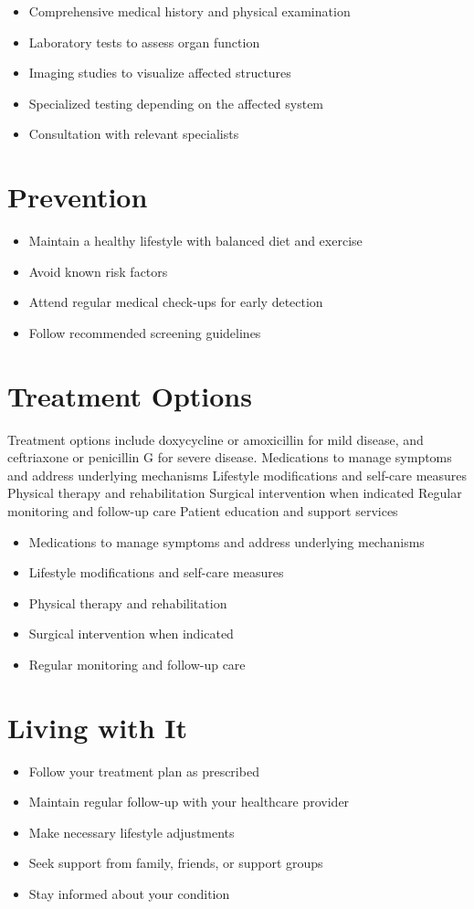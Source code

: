 \begin{itemize}[noitemsep]
  \item Comprehensive medical history and physical examination
  \item Laboratory tests to assess organ function
  \item Imaging studies to visualize affected structures
  \item Specialized testing depending on the affected system
  \item Consultation with relevant specialists
\end{itemize}
\section{Prevention}
\begin{itemize}[noitemsep]
  \item Maintain a healthy lifestyle with balanced diet and exercise
  \item Avoid known risk factors
  \item Attend regular medical check-ups for early detection
  \item Follow recommended screening guidelines
\end{itemize}
\section{Treatment Options}
Treatment options include doxycycline or amoxicillin for mild disease, and ceftriaxone or penicillin G for severe disease. Medications to manage symptoms and address underlying mechanisms Lifestyle modifications and self-care measures Physical therapy and rehabilitation Surgical intervention when indicated Regular monitoring and follow-up care Patient education and support services

\begin{itemize}[noitemsep]
  \item Medications to manage symptoms and address underlying mechanisms
  \item Lifestyle modifications and self-care measures
  \item Physical therapy and rehabilitation
  \item Surgical intervention when indicated
  \item Regular monitoring and follow-up care
\end{itemize}
\section{Living with It}
\begin{itemize}[noitemsep]
  \item Follow your treatment plan as prescribed
  \item Maintain regular follow-up with your healthcare provider
  \item Make necessary lifestyle adjustments
  \item Seek support from family, friends, or support groups
  \item Stay informed about your condition
\end{itemize}
